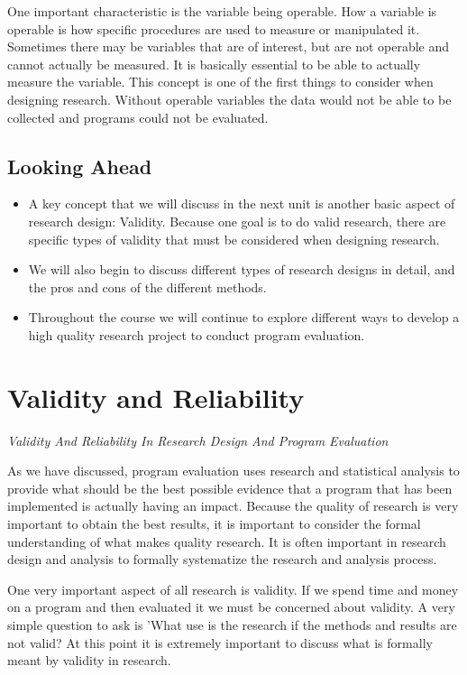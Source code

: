 \documentclass[]{book}
\theoremstyle{definition}
\theoremstyle{definition}
\theoremstyle{definition}
\theoremstyle{remark}
\begin{document}
One important characteristic is the variable being operable. How a
variable is operable is how specific procedures are used to measure or
manipulated it. Sometimes there may be variables that are of interest,
but are not operable and cannot actually be measured. It is basically
essential to be able to actually measure the variable. This concept is
one of the first things to consider when designing research. Without
operable variables the data would not be able to be collected and
programs could not be evaluated.

\hypertarget{looking-ahead-3}{%
\section{Looking Ahead}\label{looking-ahead-3}}

\begin{itemize}
\item
  A key concept that we will discuss in the next unit is another basic
  aspect of research design: Validity. Because one goal is to do valid
  research, there are specific types of validity that must be considered
  when designing research.
\item
  We will also begin to discuss different types of research designs in
  detail, and the pros and cons of the different methods.
\item
  Throughout the course we will continue to explore different ways to
  develop a high quality research project to conduct program evaluation.
\end{itemize}

\hypertarget{validity-and-reliability}{%
\chapter{Validity and Reliability}\label{validity-and-reliability}}

\emph{Validity And Reliability In Research Design And Program
Evaluation}

As we have discussed, program evaluation uses research and statistical
analysis to provide what should be the best possible evidence that a
program that has been implemented is actually having an impact. Because
the quality of research is very important to obtain the best results, it
is important to consider the formal understanding of what makes quality
research. It is often important in research design and analysis to
formally systematize the research and analysis process.

One very important aspect of all research is validity. If we spend time
and money on a program and then evaluated it we must be concerned about
validity. A very simple question to ask is 'What use is the research if
the methods and results are not valid? At this point it is extremely
important to discuss what is formally meant by validity in research.
\end{document}
